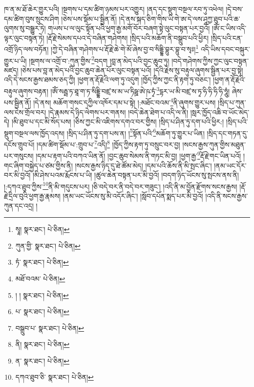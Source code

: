 ཁ་ན་མ་ཐོ་ཆེར་གྱུར་པའི། །སྔགས་པ་དམ་ཚིག་ཉམས་པར་འགྱུར། །ནད་དང་སྡུག་བསྔལ་རབ་ཏུ་འཕེལ། །དེ་བས་དམ་ཚིག་བུས་སྲུངས་ཤིག །ཅེས་པས་སྡོམ་པ་སྦྱིན་ནོ། །དེ་ནས་སྐད་ཅིག་གིས་ཡི་གེ་ཨ་དེ་ལས་ཤཱཀྱ་ཐུབ་པའི་ཆ་ལུགས་སུ་བསྒྱུར་ཏེ། གཡས་པ་ལ་ལུང་སྟོན་པའི་ཕྱག་རྒྱ་མགོ་བོར་བཞག་སྟེ་ལུང་བསྟན་པར་བྱའོ། །ཨོཾ་ང་ཡིས་འདི་ལྟར་ལུང་བསྟན་ཏེ། །རྡོ་རྗེ་སེམས་དཔའ་དེ་བཞིན་གཤེགས། །སྲིད་པའི་མཆོག་ནི་བསྒྲུབ་པའི་ཕྱིར། །སྲིད་པའི་ངན་འགྲོ་ཉིད་ལས་བཏོན། །ཀྱེ་དེ་བཞིན་གཤེགས་པ་རྡོ་རྗེ་ཆེ་གེ་མོ་ཞེས་བྱ་བ་སིདྡྷི་བྷུར་བྷུ་བ་སྭཿ།\footnote{སྭཱ།  སྣར་ཐང་།  པེ་ཅིན། } འདི་ཡིས་དབང་བསྐུར་གྱུར་པ་ཡི། །སྔགས་ལ་འགྲོ་བ་:ཀུན་གྱིས་\footnote{ཀུན་གྱི་  སྣར་ཐང་།  པེ་ཅིན། }བདག །བླ་ན་མེད་པའི་བྱང་ཆུབ་ཏུ། །བདེ་གཤེགས་ཀྱིས་ཀྱང་ལུང་བསྟན་མཛད། །ཅེས་པས་བླ་ན་མེད་པའི་བྱང་ཆུབ་ཆེན་པོར་ལུང་བསྟན་པའོ། །དེའི་རྗེས་སུ་བརྟུལ་ཞུགས་སྦྱིན་པར་བྱ་སྟེ། འདི་དེ་སངས་རྒྱས་ཐམས་ཅད་ཀྱི། །ཕྱག་ན་རྡོ་རྗེའི་ལག་ཏུ་འདུག །ཁྱོད་ཀྱིས་ཀྱང་ནི་རྟག་ཏུ་བཅང་། །ཕྱག་ན་རྡོ་རྗེའི་བརྟུལ་ཞུགས་བརྟན། །ཨོཾ་སརྦྦ་ཏ་ཐཱ་ག་ཏ་སིདྡྷི་བཛྲ་ས་མ་ཡ་ཏིཥྛ་ཨེ་ཥ་ཏྭཾ་\footnote{ཏཾ་  སྣར་ཐང་།  པེ་ཅིན། }དྷར་ཡ་མི་བཛྲ་ས་ཏྭ་ཧི་ཧི་ཧི་ཧི་ཧཱུཾ། ཞེས་པས་སྦྱིན་ནོ། །དེ་ནས། མཆོག་གསང་དཀྱིལ་འཁོར་དམ་པ་སྟེ། །:མཐོང་བའམ་\footnote{མཐོ་བའམ་  པེ་ཅིན། }ནི་ཞུགས་གྱུར་པས། །སྲིད་པ་ཀུན་ལས་ངེས་གྲོལ་བར། །དེ་རྣམས་དེ་ཉིད་ལེགས་པར་གནས། །བདེ་ཆེན་ཐེག་པ་འདི་ལ་ནི། །སླར་ཁྱོད་འཆི་བ་ཡོང་མེད་དེ། །མི་ཐུབ་པ་དང་མི་སོད་པས། །ཅིས་ཀྱང་མི་འཇིགས་དགའ་བར་གྱིས། །སྲིད་པ་ཤིན་ཏུ་དག་པའི་ཕྱིར:། །སྲིད་པའི་སྡུག་བསྔལ་ལས་ཁྱོད་འདས། །སྲིད་པ་ཤིན་ཏུ་དག་པས་ན། །\footnote{། །  སྣར་ཐང་།  པེ་ཅིན། }སྟོན་པའི་\footnote{པ་  སྣར་ཐང་།  པེ་ཅིན། }མཆོག་ཏུ་གྱུར་པ་ཡིན། །སྲིད་དང་གཏན་དུ་དངོས་གྲུབ་པོ། །དམ་ཚིག་སྡོམ་པ་:གྲུབ་པ་\footnote{བསྒྲུབ་པ་  སྣར་ཐང་།  པེ་ཅིན། }འདི།\footnote{ནི།  སྣར་ཐང་།  པེ་ཅིན། } །ཁྱོད་ཀྱིས་རྟག་ཏུ་བསྲུང་བར་བྱ། །སངས་རྒྱས་ཀུན་གྱིས་མཐུན་པར་གསུངས། །དམ་པ་རྟག་པའི་བཀའ་ཡིན་ནོ། །བྱང་ཆུབ་སེམས་ནི་གཏང་མི་བྱ། །ཕྱག་རྒྱ་\footnote{ན་  སྣར་ཐང་།  པེ་ཅིན། }རྡོ་རྗེ་གང་ཡིན་པའོ། །གང་ཞིག་བསྐྱེད་པ་ཙམ་གྱིས་ནི། །སངས་རྒྱས་ཉིད་དུ་ཐེ་ཚོམ་མེད། །དམ་པའི་ཆོས་ནི་མི་སྤང་ཞིང་། །ནམ་ཡང་དོར་བར་མི་བྱའོ། །མི་ཤེས་པའམ་རྨོངས་པ་ཡི། །ཚུལ་ཆེན་བསྟན་པར་མི་བྱའོ། །བདག་ཉིད་ཡོངས་སུ་སྤངས་ནས་ནི། །:དཀའ་ཐུབ་ཀྱིས་\footnote{དཀའ་ཐུབ་ཅི་  སྣར་ཐང་།  པེ་ཅིན། }ནི་མི་གདུངས་པར། །ཅི་བདེ་བར་ནི་བདེ་བར་གཟུང་། །འདི་ནི་མ་བྱོན་རྫོགས་སངས་རྒྱས། །རྡོ་རྗེ་དྲིལ་བུའི་ཕྱག་རྒྱ་རྣམས། །ནམ་ཡང་ཡོངས་སུ་མི་འདོར་ཞིང་། །སློབ་དཔོན་སྨད་པར་མི་བྱའོ། །འདི་ནི་སངས་རྒྱས་ཀུན་དང་འདྲ། །

